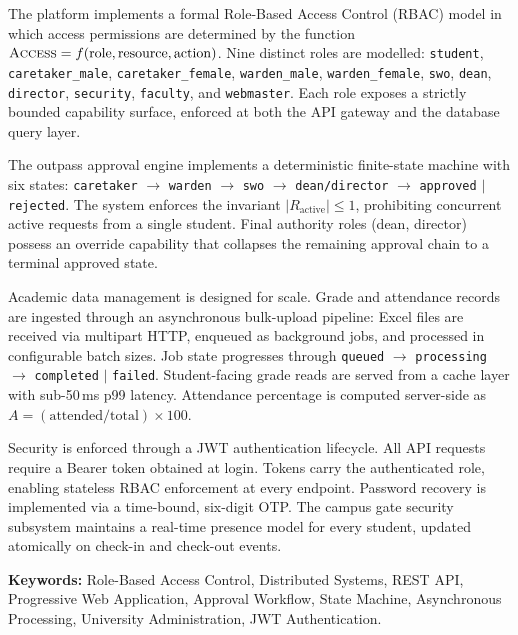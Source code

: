 \documentclass[12pt,a4paper]{report}
\newcommand{\role}[1]{\texttt{#1}}
\begin{document}
\vspace{0.4cm}
\noindent The platform implements a formal Role-Based Access Control (RBAC) model in which access permissions are determined by the function $\textsc{Access} = f(\text{role}, \text{resource}, \text{action})$. Nine distinct roles are modelled: \role{student}, \role{caretaker\_male}, \role{caretaker\_female}, \role{warden\_male}, \role{warden\_female}, \role{swo}, \role{dean}, \role{director}, \role{security}, \role{faculty}, and \role{webmaster}. Each role exposes a strictly bounded capability surface, enforced at both the API gateway and the database query layer.

\vspace{0.4cm}
\noindent The outpass approval engine implements a deterministic finite-state machine with six states: \texttt{caretaker} $\to$ \texttt{warden} $\to$ \texttt{swo} $\to$ \texttt{dean/director} $\to$ \texttt{approved} $\mid$ \texttt{rejected}. The system enforces the invariant $|R_{\text{active}}| \leq 1$, prohibiting concurrent active requests from a single student. Final authority roles (dean, director) possess an override capability that collapses the remaining approval chain to a terminal approved state.

\vspace{0.4cm}
\noindent Academic data management is designed for scale. Grade and attendance records are ingested through an asynchronous bulk-upload pipeline: Excel files are received via multipart HTTP, enqueued as background jobs, and processed in configurable batch sizes. Job state progresses through \texttt{queued} $\to$ \texttt{processing} $\to$ \texttt{completed} $\mid$ \texttt{failed}. Student-facing grade reads are served from a cache layer with sub-50\,ms p99 latency. Attendance percentage is computed server-side as $A = (\text{attended} / \text{total}) \times 100$.

\vspace{0.4cm}
\noindent Security is enforced through a JWT authentication lifecycle. All API requests require a Bearer token obtained at login. Tokens carry the authenticated role, enabling stateless RBAC enforcement at every endpoint. Password recovery is implemented via a time-bound, six-digit OTP. The campus gate security subsystem maintains a real-time presence model for every student, updated atomically on check-in and check-out events.

\vspace{0.6cm}
\noindent \textbf{Keywords:} Role-Based Access Control, Distributed Systems, REST API, Progressive Web Application, Approval Workflow, State Machine, Asynchronous Processing, University Administration, JWT Authentication.
\end{document}
